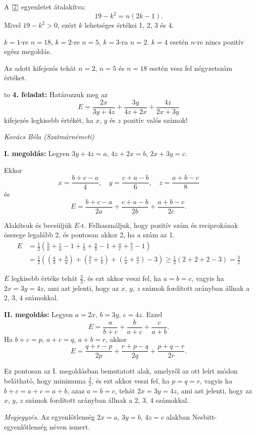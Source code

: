 \documentclass[a4paper,10pt]{article}
\newcommand{\ki}[2]{\hfill {\it #1 (#2)}\medskip}
\newcommand{\vonal}{\hbox to \hsize{\hskip2truecm\hrulefill\hskip2truecm}}
\begin{document}
A \eqref{7} egyenletet átalakítva:
\[19-k^2=n(2k-1).\]
Mivel $19-k^2>0$, ezért $k$ lehetséges értékei 1, 2, 3 és 4.

$k=1$-re $n=18$, $k=2$-re $n=5$, $k=3$-ra $n=2$. $k=4$ esetén $n$-re nincs pozitív egész megoldás.

Az adott kifejezés tehát $n=2$, $n=5$ és $n=18$ esetén vesz fel négyzetszám értéket.

\medskip

\vonal
{\bf 4. feladat: } Határozzuk meg az
\[E=\frac{2x}{3y+4z}+\frac{3y}{4z+2x}+\frac{4z}{2x+3y}\]
kifejezés legkisebb értékét, ha $x$, $y$ és $z$ pozitív valós számok!

\ki{Kovács Béla}{Szatmárnémeti}\medskip

{\bf I. megoldás: } Legyen $3y+4z=a$, $4z+2x=b$, $2x+3y=c$.

Ekkor
\[x=\frac{b+c-a}{4},\quad y=\frac{c+a-b}{6},\quad z=\frac{a+b-c}{8}\]
és
\[E=\frac{b+c-a}{2a}+\frac{c+a-b}{2b}+\frac{a+b-c}{2c}.\]

Alakítsuk és becsüljük $E$-t. Felhasználjuk, hogy pozitív szám és reciprokának összege legalább 2, és pontosan akkor 2, ha a szám az 1.
\begin{align*}
E&=\frac12\left(\frac{b}{a}+\frac{c}{a}-1+\frac{c}{b}+\frac{a}{b}-1+\frac{a}{c}+\frac{b}{c}-1\right)\\
&=\frac12\left(\left(\frac{a}{b}+\frac{b}{a}\right)+\left(\frac{b}{c}+\frac{c}{b}\right)+\left(\frac{c}{a}+\frac{a}{c}\right)-3\right)\ge\frac12(2+2+2-3)=\frac32
\end{align*}

$E$ legkisebb értéke tehát $\frac32$, és ezt akkor veszi fel, ha $a=b=c$, vagyis ha $2x=3y=4z$, ami azt jelenti, hogy az $x$, $y$, $z$ számok fordított arányban állnak a 2, 3, 4 számokkal.

\medskip

{\bf II. megoldás: } Legyen $a=2x$, $b=3y$, $c=4z$. Ezzel
\[E=\frac{a}{b+c}+\frac{b}{a+c}+\frac{c}{a+b}.\]
Ha $b+c=p$, $a+c=q$, $a+b=r$, akkor
\[E=\frac{q+r-p}{2p}+\frac{r+p-q}{2q}+\frac{p+q-r}{2r}.\]

Ez pontosan az I. megoldásban bemutatott alak, amelyről az ott leírt módon belátható, hogy minimuma $\frac{3}{2}$, és ezt akkor veszi fel, ha $p=q=r$, vagyis ha $b+c=a+c=a+b$, azaz $a=b=c$, tehát $2x=3y=4z$, ami azt jelenti, hogy az $x$, $y$, $z$ számok fordított arányban állnak a 2, 3, 4 számokkal.

\medskip

{\it Megjegyzés.} Az egyenlőtlenség $2x=a$, $3y=b$, $4z=c$ alakban Nesbitt-egyenlőtlenség néven ismert.
\end{document}
